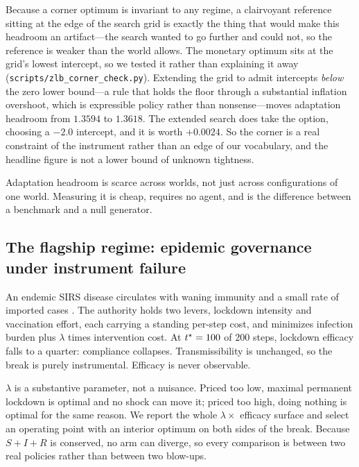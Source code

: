 \documentclass[11pt]{article}
\begin{document}
Because a corner optimum is invariant to any regime, a clairvoyant reference sitting at the edge of
the search grid is exactly the thing that would make this headroom an artifact---the search wanted to
go further and could not, so the reference is weaker than the world allows. The monetary optimum sits
at the grid's lowest intercept, so we tested it rather than explaining it away
(\texttt{scripts/zlb\_corner\_check.py}). Extending the grid to admit intercepts \emph{below} the zero
lower bound---a rule that holds the floor through a substantial inflation overshoot, which is
expressible policy rather than nonsense---moves adaptation headroom from $1.3594$ to $1.3618$. The
extended search does take the option, choosing a $-2.0$ intercept, and it is worth $+0.0024$. So the
corner is a real constraint of the instrument rather than an edge of our vocabulary, and the headline
figure is not a lower bound of unknown tightness.

\begin{takeaway}
Adaptation headroom is scarce across worlds, not just across configurations of one world. Measuring
it is cheap, requires no agent, and is the difference between a benchmark and a null generator.
\end{takeaway}

\subsection{The flagship regime: epidemic governance under instrument failure}
\label{sec:regime}

An endemic SIRS disease circulates with waning immunity and a small rate of imported cases
\citep{kermack1927contribution}. The authority holds two levers, lockdown intensity and vaccination
effort, each carrying a standing per-step cost, and minimizes infection burden plus $\lambda$ times
intervention cost. At $t^{\star} = 100$ of $200$ steps, lockdown efficacy falls to a quarter:
compliance collapses. Transmissibility is unchanged, so the break is purely instrumental. Efficacy
is never observable.

$\lambda$ is a substantive parameter, not a nuisance. Priced too low, maximal permanent lockdown is
optimal and no shock can move it; priced too high, doing nothing is optimal for the same reason. We
report the whole $\lambda \times$ efficacy surface and select an operating point with an interior
optimum on both sides of the break. Because $S+I+R$ is conserved, no arm can diverge, so every
comparison is between two real policies rather than between two blow-ups.
\end{document}
